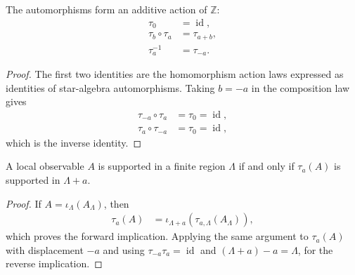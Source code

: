 \begin{lemma}
    \label{lem:qca_algebraic_local_translation_action}
    \leanok
    The automorphisms form an additive action of $\mathbb Z$:
    \begin{align}
        \tau_0            & =\operatorname{id}, \\
        \tau_b\circ\tau_a & =\tau_{a+b},        \\
        \tau_a^{-1}       & =\tau_{-a}.
    \end{align}
\end{lemma}

\begin{proof}\leanok
    The first two identities are the homomorphism action laws expressed as
    identities of star-algebra automorphisms. Taking $b=-a$ in the composition
    law gives
    \begin{align}
        \tau_{-a}\circ\tau_a & =\tau_0=\operatorname{id}, \\
        \tau_a\circ\tau_{-a} & =\tau_0=\operatorname{id},
    \end{align}
    which is the inverse identity.
\end{proof}

\begin{lemma}
    \label{lem:qca_algebraic_local_translation_support}
    \leanok
    A local observable $A$ is supported in a finite region $\Lambda$ if and only
    if $\tau_a(A)$ is supported in $\Lambda+a$.
\end{lemma}

\begin{proof}\leanok
    If $A=\iota_\Lambda(A_\Lambda)$, then
    \begin{align}
        \tau_a(A)
         & =\iota_{\Lambda+a}(\tau_{a,\Lambda}(A_\Lambda)),
    \end{align}
    which proves the forward implication. Applying the same argument to
    $\tau_a(A)$ with displacement $-a$ and using
    $\tau_{-a}\tau_a=\operatorname{id}$ and
    $(\Lambda+a)-a=\Lambda$, for the reverse implication.
\end{proof}


